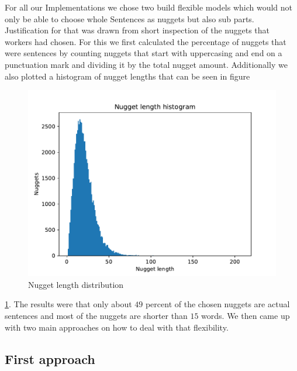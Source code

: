 \documentclass{article}
\begin{document}
For all our Implementations we chose two build flexible models which would not only be able to choose whole Sentences as nuggets but also sub parts. Justification for that was drawn from short inspection of the nuggets that workers had chosen. For this we first calculated the percentage of nuggets that were sentences by counting nuggets that start with uppercasing and end on a punctuation mark and dividing it by the total nugget amount. Additionally we also plotted a histogram of nugget lengths that can be seen in figure
\begin{figure}[!ht]
	\centering
	\includegraphics[width=0.55\linewidth]{Nugget_size.pdf}
	\caption{Nugget length distribution}
	\label{fig:nuggets}
\end{figure}
\ref{fig:nuggets}.
The results were that only about $49$ percent of the chosen nuggets are actual sentences and most of the nuggets are shorter than $15$ words. We then came up with two main approaches on how to deal with that flexibility.

\subsection{First approach}
\end{document}
